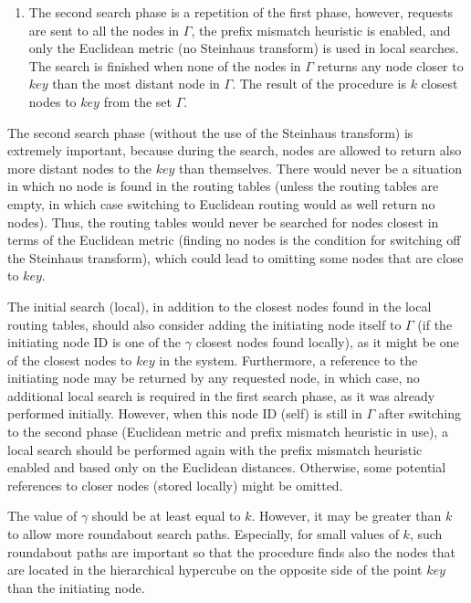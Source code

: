\begin{enumerate}
\smallskip
\item The second search phase is a repetition of the first phase, however, requests are sent to all the nodes in $\Gamma$, the prefix mismatch heuristic is enabled, and only the Euclidean metric (no Steinhaus transform) is used in local searches. The search is finished when none of the nodes in $\Gamma$ returns any node closer to $key$ than the most distant node in $\Gamma$. The result of the procedure is $k$ closest nodes to $key$ from the set $\Gamma$.

\end{enumerate}

The second search phase (without the use of the Steinhaus transform) is extremely important, because during the search, nodes are allowed to return also more distant nodes to the $key$ than themselves. There would never be a situation in which no node is found in the routing tables (unless the routing tables are empty, in which case switching to Euclidean routing would as well return no nodes). Thus, the routing tables would never be searched for nodes closest in terms of the Euclidean metric (finding no nodes is the condition for switching off the Steinhaus transform), which could lead to omitting some nodes that are close to $key$.

The initial search (local), in addition to the closest nodes found in the local routing tables, should also consider adding the initiating node itself to $\Gamma$ (if the initiating node ID is one of the $\gamma$ closest nodes found locally), as it might be one of the closest nodes to $key$ in the system. Furthermore, a reference to the initiating node may be returned by any requested node, in which case, no additional local search is required in the first search phase, as it was already performed initially. However, when this node ID (self) is still in $\Gamma$ after switching to the second phase (Euclidean metric and prefix mismatch heuristic in use), a local search should be performed again with the prefix mismatch heuristic enabled and based only on the Euclidean distances. Otherwise, some potential references to closer nodes (stored locally) might be omitted.

The value of $\gamma$ should be at least equal to $k$. However, it may be greater than $k$ to allow more roundabout search paths. Especially, for small values of $k$, such roundabout paths are important so that the procedure finds also the nodes that are located in the hierarchical hypercube on the opposite side of the point $key$ than the initiating node.

